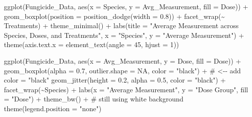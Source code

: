 \documentclass[
  10pt,
  letterpaper,
  twocolumn]{article}
\newenvironment{Shaded}{\begin{snugshade}}{\end{snugshade}}
\newcommand{\AttributeTok}[1]{\textcolor[rgb]{0.40,0.45,0.13}{#1}}
\newcommand{\CommentTok}[1]{\textcolor[rgb]{0.37,0.37,0.37}{#1}}
\newcommand{\ConstantTok}[1]{\textcolor[rgb]{0.56,0.35,0.01}{#1}}
\newcommand{\DecValTok}[1]{\textcolor[rgb]{0.68,0.00,0.00}{#1}}
\newcommand{\FloatTok}[1]{\textcolor[rgb]{0.68,0.00,0.00}{#1}}
\newcommand{\FunctionTok}[1]{\textcolor[rgb]{0.28,0.35,0.67}{#1}}
\newcommand{\NormalTok}[1]{\textcolor[rgb]{0.00,0.23,0.31}{#1}}
\newcommand{\SpecialCharTok}[1]{\textcolor[rgb]{0.37,0.37,0.37}{#1}}
\newcommand{\StringTok}[1]{\textcolor[rgb]{0.13,0.47,0.30}{#1}}
\begin{document}
\begin{Shaded}
\begin{Highlighting}[]
\FunctionTok{ggplot}\NormalTok{(Fungicide\_Data, }\FunctionTok{aes}\NormalTok{(}\AttributeTok{x =}\NormalTok{ Species, }\AttributeTok{y =}\NormalTok{ Avg\_Measurement, }\AttributeTok{fill =}\NormalTok{ Dose)) }\SpecialCharTok{+}
  \FunctionTok{geom\_boxplot}\NormalTok{(}\AttributeTok{position =} \FunctionTok{position\_dodge}\NormalTok{(}\AttributeTok{width =} \FloatTok{0.8}\NormalTok{)) }\SpecialCharTok{+}
  \FunctionTok{facet\_wrap}\NormalTok{(}\SpecialCharTok{\textasciitilde{}}\NormalTok{ Treatments) }\SpecialCharTok{+}
  \FunctionTok{theme\_minimal}\NormalTok{() }\SpecialCharTok{+}
  \FunctionTok{labs}\NormalTok{(}\AttributeTok{title =} \StringTok{"Average Measurement across Species, Doses, and Treatments"}\NormalTok{,}
       \AttributeTok{x =} \StringTok{"Species"}\NormalTok{,}
       \AttributeTok{y =} \StringTok{"Average Measurement"}\NormalTok{) }\SpecialCharTok{+}
  \FunctionTok{theme}\NormalTok{(}\AttributeTok{axis.text.x =} \FunctionTok{element\_text}\NormalTok{(}\AttributeTok{angle =} \DecValTok{45}\NormalTok{, }\AttributeTok{hjust =} \DecValTok{1}\NormalTok{))}


\FunctionTok{ggplot}\NormalTok{(Fungicide\_Data, }\FunctionTok{aes}\NormalTok{(}\AttributeTok{x =}\NormalTok{ Avg\_Measurement, }\AttributeTok{y =}\NormalTok{ Dose, }\AttributeTok{fill =}\NormalTok{ Dose)) }\SpecialCharTok{+}
  \FunctionTok{geom\_boxplot}\NormalTok{(}\AttributeTok{alpha =} \FloatTok{0.7}\NormalTok{, }\AttributeTok{outlier.shape =} \ConstantTok{NA}\NormalTok{, }\AttributeTok{color =} \StringTok{"black"}\NormalTok{) }\SpecialCharTok{+}  \CommentTok{\# \textless{}{-}{-} add color = "black"}
  \FunctionTok{geom\_jitter}\NormalTok{(}\AttributeTok{height =} \FloatTok{0.2}\NormalTok{, }\AttributeTok{alpha =} \FloatTok{0.5}\NormalTok{, }\AttributeTok{color =} \StringTok{"black"}\NormalTok{) }\SpecialCharTok{+}
  \FunctionTok{facet\_wrap}\NormalTok{(}\SpecialCharTok{\textasciitilde{}}\NormalTok{Species) }\SpecialCharTok{+}
  \FunctionTok{labs}\NormalTok{(}\AttributeTok{x =} \StringTok{"Average Measurement"}\NormalTok{, }\AttributeTok{y =} \StringTok{"Dose Group"}\NormalTok{, }\AttributeTok{fill =} \StringTok{"Dose"}\NormalTok{) }\SpecialCharTok{+}
  \FunctionTok{theme\_bw}\NormalTok{() }\SpecialCharTok{+}  \CommentTok{\# still using white background}
  \FunctionTok{theme}\NormalTok{(}\AttributeTok{legend.position =} \StringTok{"none"}\NormalTok{)}


\end{Highlighting}
\end{Shaded}
\end{document}
